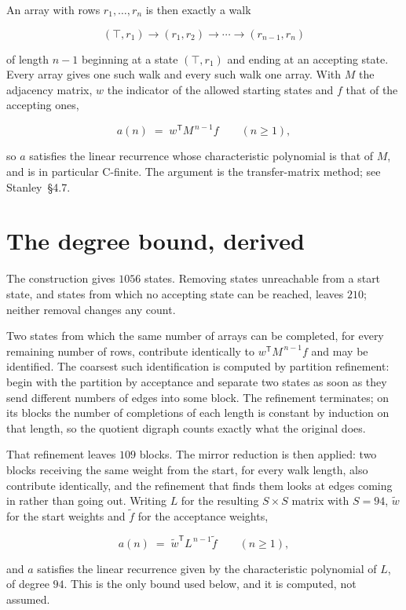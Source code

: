 \documentclass[11pt]{article}
\theoremstyle{definition}
\begin{document}
An array with rows $r_1,\dots,r_n$ is then exactly a walk

\[(\top,r_1) \to (r_1,r_2) \to \cdots \to (r_{n-1},r_n)\]

of length $n-1$ beginning at a state $(\top,r_1)$ and ending at an accepting state. Every array gives one such walk and every such walk one array. With $M$ the adjacency matrix, $w$ the indicator of the allowed starting states and $f$ that of the accepting ones,

\[a(n) \;=\; w^{\mathsf T} M^{\,n-1} f \qquad (n \ge 1),\]

so $a$ satisfies the linear recurrence whose characteristic polynomial is that of $M$, and is in particular C-finite. The argument is the transfer-matrix method; see Stanley~\S4.7.

\section{The degree bound, derived}

The construction gives $1056$ states. Removing states unreachable from a start state, and states from which no accepting state can be reached, leaves $210$; neither removal changes any count.

Two states from which the same number of arrays can be completed, for every remaining number of rows, contribute identically to $w^{\mathsf T}M^{\,n-1}f$ and may be identified. The coarsest such identification is computed by partition refinement: begin with the partition by acceptance and separate two states as soon as they send different numbers of edges into some block. The refinement terminates; on its blocks the number of completions of each length is constant by induction on that length, so the quotient digraph counts exactly what the original does.

That refinement leaves $109$ blocks. The mirror reduction is then applied: two blocks receiving the same weight from the start, for every walk length, also contribute identically, and the refinement that finds them looks at edges coming in rather than going out. Writing $L$ for the resulting $S \times S$ matrix with $S = 94$, $\tilde w$ for the start weights and $\tilde f$ for the acceptance weights,

\[a(n) \;=\; \tilde w^{\mathsf T} L^{\,n-1} \tilde f \qquad (n \ge 1),\]

and $a$ satisfies the linear recurrence given by the characteristic polynomial of $L$, of degree $94$. This is the only bound used below, and it is computed, not assumed.
\end{document}
